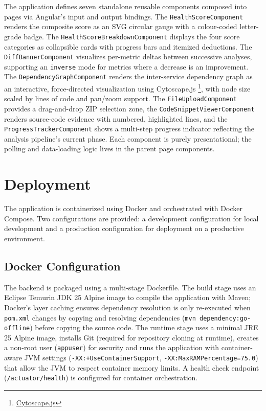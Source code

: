  \par The application defines seven standalone reusable components composed into pages via Angular's input and output bindings. The \texttt{HealthScoreComponent} renders the composite score as an SVG circular gauge with a colour-coded letter-grade badge. The \texttt{HealthScoreBreakdownComponent} displays the four score categories as collapsible cards with progress bars and itemized deductions. The \texttt{Diff\-Ban\-nerCom\-ponent} visualizes per-metric deltas between successive analyses, supporting an \texttt{inverse} mode for metrics where a decrease is an improvement. The \texttt{De\-pen\-den\-cy\-Graph\-Com\-ponent} renders the inter-service dependency graph as an interactive, force-directed visualization using Cytoscape.js \footnote{\href{https://cytoscape.org/index.html}{Cytoscape.js}}, with node size scaled by lines of code and pan/zoom support. The \texttt{FileUploadComponent} provides a drag-and-drop ZIP selection zone, the \texttt{CodeSnippetViewerComponent} renders source-code evidence with numbered, highlighted lines, and the \texttt{Pro\-gress\-Tra\-cker\-Com\-ponent} shows a multi-step progress indicator reflecting the analysis pipeline's current phase. Each component is purely presentational; the polling and data-loading logic lives in the parent page components.

\section{Deployment}
\label{sec:deployment}

 \par The application is containerized using Docker and orchestrated with Docker Compose. Two configurations are provided: a development configuration for local development and a production configuration for deployment on a productive environment.

\subsection{Docker Configuration}
\label{subsec:docker-config}

 \par The backend is packaged using a multi-stage Dockerfile. The build stage uses an Eclipse Temurin JDK 25 Alpine image to compile the application with Maven; Docker's layer caching ensures dependency resolution is only re-executed when \texttt{pom.xml} changes by copying and resolving dependencies (\texttt{mvn dependency:go-offline}) before copying the source code. The runtime stage uses a minimal JRE 25 Alpine image, installs Git (required for repository cloning at runtime), creates a non-root user (\texttt{appuser}) for security and runs the application with container-aware JVM settings (\texttt{-XX:+UseContainerSupport}, \texttt{-XX:MaxRAMPercentage=75.0}) that allow the JVM to respect container memory limits. A health check endpoint (\texttt{/actuator/health}) is configured for container orchestration.

